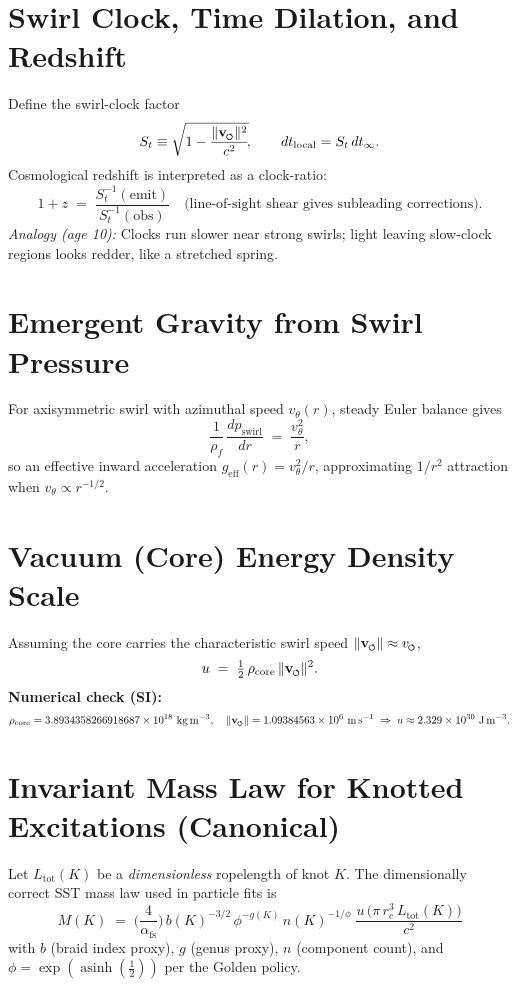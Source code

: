 \documentclass[10pt,reprint,aps,onecolumn,nofootinbib]{revtex4-2}
\newcommand{\swirlarrow}{%
    \mathchoice{\mkern-2mu\scriptstyle\boldsymbol{\circlearrowleft}}%
    {\mkern-2mu\scriptstyle\boldsymbol{\circlearrowleft}}%
    {\mkern-2mu\scriptscriptstyle\boldsymbol{\circlearrowleft}}%
    {\mkern-2mu\scriptscriptstyle\boldsymbol{\circlearrowleft}}%
}
\newcommand{\vswirl}{\mathbf{v}_{\swirlarrow}}
\newcommand{\vscore}{v_{\swirlarrow}}
\newcommand{\vnorm}{\lVert \vswirl \rVert}
\newcommand{\rhof}{\rho_{\!f}}
\newcommand{\rc}{r_c}
\newcommand{\xig}{\operatorname{asinh}\!\left(\tfrac{1}{2}\right)}
\newcommand{\phig}{\exp(\xig)}
\newcommand{\vswirlval}{1.09384563\times 10^{6}\ \si{m.s^{-1}}}
\newcommand{\rhocoreval}{3.8934358266918687\times 10^{18}\ \si{kg.m^{-3}}}
\begin{document}
\section*{Swirl Clock, Time Dilation, and Redshift}
Define the swirl-clock factor
\[
S_t \equiv \sqrt{1-\frac{\vnorm^2}{c^2}}\!,
\qquad
dt_{\mathrm{local}} = S_t\, dt_{\infty}.
\]
Cosmological redshift is interpreted as a clock-ratio:
\[
1+z \;=\; \frac{S_t^{-1}(\mathrm{emit})}{S_t^{-1}(\mathrm{obs})}
\quad\text{(line-of-sight shear gives subleading corrections).}
\]
\emph{Analogy (age 10):} Clocks run slower near strong swirls; light leaving slow-clock regions looks redder, like a stretched spring.

\section*{Emergent Gravity from Swirl Pressure}
For axisymmetric swirl with azimuthal speed \(v_\theta(r)\), steady Euler balance gives
\[
\frac{1}{\rhof}\,\frac{dp_{\text{swirl}}}{dr} \;=\; \frac{v_\theta^2}{r},
\]
so an effective inward acceleration \(g_{\text{eff}}(r)=v_\theta^2/r\), approximating \(1/r^2\) attraction when \(v_\theta\propto r^{-1/2}\). %

\section*{Vacuum (Core) Energy Density Scale}
Assuming the core carries the characteristic swirl speed \( \vnorm\approx \vscore \),
\[
u \;=\; \tfrac{1}{2}\,\rho_{\text{core}}\,\vnorm^2.
\]
\textbf{Numerical check (SI):}
\[
\rho_{\text{core}}=\rhocoreval,\quad \vnorm=\vswirlval
\;\Rightarrow\;
u \approx 2.329\times 10^{30}\ \si{J.m^{-3}}.
\]

\section*{Invariant Mass Law for Knotted Excitations (Canonical)}
Let \(L_{\text{tot}}(K)\) be a \emph{dimensionless} ropelength of knot \(K\). The dimensionally correct SST mass law used in particle fits is
\begin{equation}
\boxed{\
M(K)\;=\;\Big(\frac{4}{\alpha_{\mathrm{fs}}}\Big)\, b(K)^{-3/2}\,\phi^{-g(K)}\,n(K)^{-1/\phi}\;
\frac{u\,\big(\pi\,\rc^{3}\,L_{\text{tot}}(K)\big)}{c^{2}}\
}
\label{eq:mass-law}
\end{equation}
with \(b\) (braid index proxy), \(g\) (genus proxy), \(n\) (component count), and \(\phi=\phig\) per the Golden policy.
\end{document}

